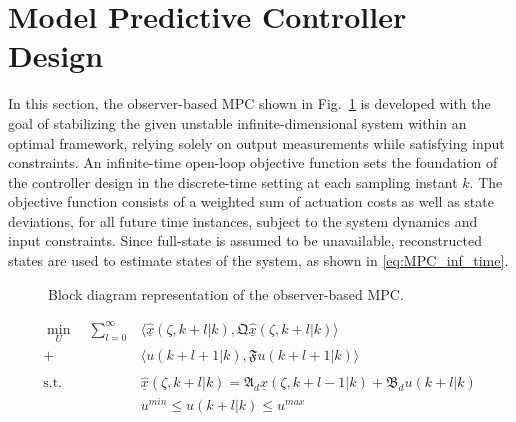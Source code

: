 \section{Model Predictive Controller Design}

In this section, the observer-based MPC shown in Fig.~\ref{fig:block_diagram} is developed with the goal of stabilizing the given unstable infinite-dimensional system within an optimal framework, relying solely on output measurements while satisfying input constraints. 
An infinite-time open-loop objective function sets the foundation of the controller design in the discrete-time setting at each sampling instant $k$. The objective function consists of a weighted sum of actuation costs as well as state deviations, for all future time instances, subject to the system dynamics and input constraints. Since full-state is assumed to be unavailable, reconstructed states are used to estimate states of the system, as shown in \eqref{eq:MPC_inf_time}.

\begin{figure}[!htbp]
    \centering
    \caption{Block diagram representation of the observer-based MPC.}
    \label{fig:block_diagram}
\end{figure}

\begin{equation} \label{eq:MPC_inf_time}
    \begin{aligned}
        \min_{U} \quad \sum_{l=0}^{\infty} &\langle \underline{\hat{x}}(\zeta, k+l | k), \mathfrak{Q} \underline{\hat{x}}(\zeta, k+l | k) \rangle \\
        + &\langle u(k+l+1 | k), \mathfrak{F} u(k+l+1|k) \rangle \\
        \, \\
        \text{s.t.} \quad &\underline{\hat{x}}(\zeta, k+l | k) = \mathfrak{A}_d \underline{\hat{x}}(\zeta, k+l-1 | k) + \mathfrak{B}_d u(k+l | k) \\
        &u^{min} \leq u(k+l | k) \leq u^{max}
    \end{aligned}
\end{equation}

